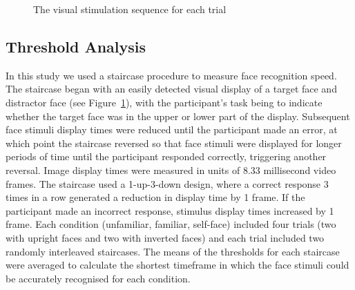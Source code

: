 \documentclass[
  authoryear,
  review,
  3p,
  onecolumn]{elsarticle}
\begin{document}
\begin{figure}


\caption{\label{fig-procedure}The visual stimulation sequence for each
trial}

\end{figure}%

\subsection{Threshold Analysis}\label{threshold-analysis}

In this study we used a staircase procedure to measure face recognition
speed. The staircase began with an easily detected visual display of a
target face and distractor face (see Figure~\ref{fig-procedure}), with
the participant's task being to indicate whether the target face was in
the upper or lower part of the display. Subsequent face stimuli display
times were reduced until the participant made an error, at which point
the staircase reversed so that face stimuli were displayed for longer
periods of time until the participant responded correctly, triggering
another reversal. Image display times were measured in units of 8.33
millisecond video frames. The staircase used a 1-up-3-down design, where
a correct response 3 times in a row generated a reduction in display
time by 1 frame. If the participant made an incorrect response, stimulus
display times increased by 1 frame. Each condition (unfamiliar,
familiar, self-face) included four trials (two with upright faces and
two with inverted faces) and each trial included two randomly
interleaved staircases. The means of the thresholds for each staircase
were averaged to calculate the shortest timeframe in which the face
stimuli could be accurately recognised for each condition.
\end{document}
